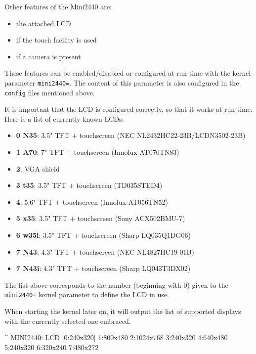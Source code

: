 Other features of the Mini2440 are:

\begin{itemize}
 \item the attached LCD
 \item if the touch facility is used
 \item if a camera is present
\end{itemize}

These features can be enabled/disabled or configured at run-time with the kernel
parameter \texttt{mini2440=}. The content of this parameter is also configured
in the \texttt{config} files mentioned above.

It is important that the LCD is configured correctly, so that it works at
run-time. Here is a list of currently known LCDs:

\begin{itemize}
 \item \textbf{0 N35}: 3.5" TFT + touchscreen (NEC NL2432HC22-23B/LCDN3502-23B)
 \item \textbf{1 A70}: 7" TFT + touchscreen (Innolux AT070TN83)
 \item \textbf{2}: VGA shield
 \item \textbf{3 t35}: 3.5" TFT + touchscreen (TD035STED4)
 \item \textbf{4}: 5.6" TFT + touchscreen (Innolux AT056TN52)
 \item \textbf{5 x35}: 3.5" TFT + touchscreen (Sony ACX502BMU-7)
 \item \textbf{6 w35i}: 3.5" TFT + touchscreen (Sharp LQ035Q1DG06)
 \item \textbf{7 N43}: 4.3" TFT + touchscreen (NEC NL4827HC19-01B)
 \item \textbf{7 N43i}: 4.3" TFT + touchscreen (Sharp LQ043T3DX02)
\end{itemize}

The list above corresponds to the number (beginning with 0) given to the
\texttt{mini2440=} kernel parameter to define the LCD in use.

When starting the kernel later on, it will output the list of supported displays
with the currently selected one embraced.

\begin{ptxshell}[escapechar=|]{^}
MINI2440: LCD [0:240x320] 1:800x480 2:1024x768 3:240x320 4:640x480 5:240x320 6:320x240 7:480x272
\end{ptxshell}

